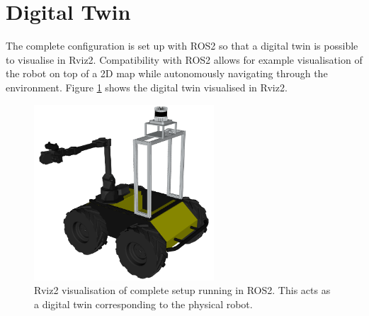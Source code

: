 



\section{Digital Twin} \label{sec:R:DigitalTwin}
The complete configuration is set up with ROS2 so that a digital twin is possible to visualise in Rviz2. Compatibility with ROS2 allows for example visualisation of the robot on top of a 2D map while autonomously navigating through the environment. Figure \ref{fig:R:H:DT:DigitalTwin} shows the digital twin visualised in Rviz2.

\begin{figure}[H]
  \centering
  \includegraphics[width = 0.6\textwidth]{Figures/figDigitalTwin.png}
  \caption{Rviz2 visualisation of complete setup running in ROS2. This acts as a digital twin corresponding to the physical robot.}
  \label{fig:R:H:DT:DigitalTwin}
\end{figure}

